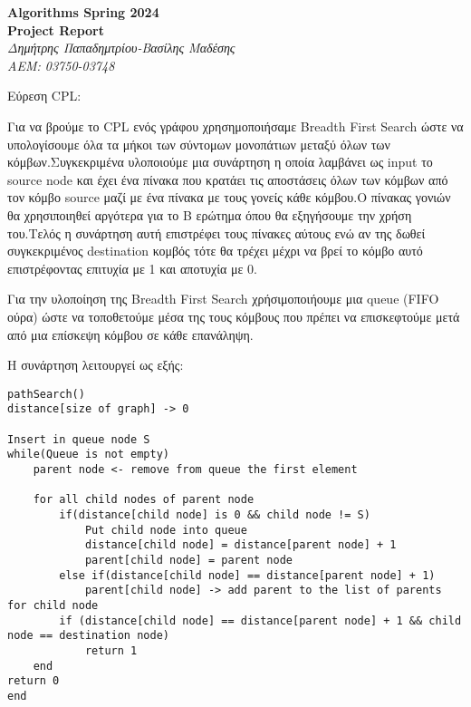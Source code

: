 \documentclass{article}
\begin{document}
\begin{titlepage}
   \begin{center}
   	  \Large\textbf{Algorithms Spring 2024}\\
      \Large\textbf{Project Report}\\
      \large\textit{Δημήτρης Παπαδημτρίου-Βασίλης Μαδέσης}\\
      \large\textit{AEM: 03750-03748}
   \end{center}
\end{titlepage}

Εύρεση CPL:\bigbreak

Για να βρούμε το CPL ενός γράφου χρησημοποιήσαμε Breadth First Search ώστε να υπολογίσουμε όλα τα μήκοι των σύντομων μονοπάτιων μεταξύ όλων των κόμβων.Συγκεκριμένα υλοποιούμε μια συνάρτηση η οποία λαμβάνει ως input το source node και έχει ένα πίνακα που κρατάει τις αποστάσεις όλων των κόμβων από τον κόμβο source μαζί με ένα πίνακα με τους γονείς κάθε κόμβου.Ο πίνακας γονιών θα χρησιποιηθεί αργότερα για το Β ερώτημα όπου θα εξηγήσουμε την χρήση του.Τελός η συνάρτηση αυτή επιστρέφει τους πίνακες αύτους ενώ αν της δωθεί συγκεκριμένος destination κομβός τότε θα τρέχει μέχρι να βρεί το κόμβο αυτό επιστρέφοντας επιτυχία με 1 και αποτυχία με 0.\bigbreak

Για την υλοποίηση της  Breadth First Search χρήσιμοποιήουμε μια queue (FIFO ούρα) ώστε να τοποθετούμε μέσα της τους κόμβους που πρέπει να επισκεφτούμε μετά από μια επίσκεψη κόμβου σε κάθε επανάληψη.\bigbreak

Η συνάρτηση λειτουργεί ως εξής:

\begin{lstlisting}
pathSearch()
distance[size of graph] -> 0

Insert in queue node S
while(Queue is not empty)
	parent node <- remove from queue the first element
	
	for all child nodes of parent node
		if(distance[child node] is 0 && child node != S)
			Put child node into queue
			distance[child node] = distance[parent node] + 1
			parent[child node] = parent node
		else if(distance[child node] == distance[parent node] + 1)
			parent[child node] -> add parent to the list of parents for child node
		if (distance[child node] == distance[parent node] + 1 && child node == destination node)
			return 1
	end	
return 0
end
\end{lstlisting}\bigbreak
{}
\end{document}
